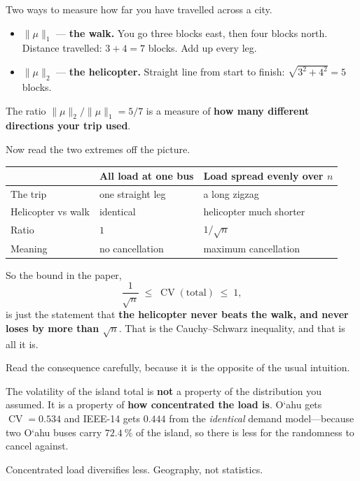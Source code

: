 \documentclass[11pt,a4paper]{article}
\newcommand{\okina}{\textquoteleft}
\newcommand{\CV}{\operatorname{CV}}
\begin{document}
\begin{anchor}
Two ways to measure how far you have travelled across a city.

\begin{itemize}
\item $\lVert\mu\rVert_1$ --- \textbf{the walk.} You go three blocks east, then
      four blocks north. Distance travelled: $3 + 4 = 7$ blocks. Add up every
      leg.
\item $\lVert\mu\rVert_2$ --- \textbf{the helicopter.} Straight line from start
      to finish: $\sqrt{3^2+4^2} = 5$ blocks.
\end{itemize}

The ratio $\lVert\mu\rVert_2 / \lVert\mu\rVert_1 = 5/7$ is a measure of
\textbf{how many different directions your trip used}.
\end{anchor}

\begin{build}
Now read the two extremes off the picture.

\smallskip
\begin{tabular}{@{}p{}p{}p{}@{}}
\toprule
& \textbf{All load at one bus} & \textbf{Load spread evenly over $n$} \\
\midrule
The trip & one straight leg & a long zigzag \\
Helicopter vs walk & identical & helicopter much shorter \\
Ratio & $1$ & $1/\sqrt{n}$ \\
Meaning & no cancellation & maximum cancellation \\
\bottomrule
\end{tabular}

\smallskip
So the bound in the paper,
\[
\frac{1}{\sqrt{n}} \;\le\; \CV(\text{total}) \;\le\; 1,
\]
is just the statement that \textbf{the helicopter never beats the walk, and
never loses by more than $\sqrt{n}$}. That is the Cauchy--Schwarz inequality,
and that is all it is.
\end{build}

\begin{watch}
Read the consequence carefully, because it is the opposite of the usual
intuition.

The volatility of the island total is \textbf{not} a property of the
distribution you assumed. It is a property of \textbf{how concentrated the load
is}. O\okina ahu gets $\CV = 0.534$ and IEEE-14 gets $0.444$ from the
\emph{identical} demand model---because two O\okina ahu buses carry
$\SI{72.4}{\percent}$ of the island, so there is less for the randomness to
cancel against.

Concentrated load diversifies less. Geography, not statistics.
\end{watch}
\end{document}
